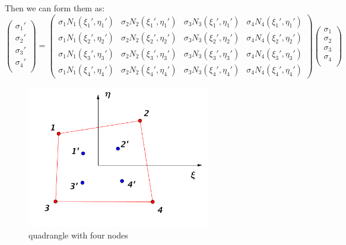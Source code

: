 Then we can form them as:
\begin{equation}
\begin{pmatrix}
{\sigma_1}' \\
{\sigma_2}' \\
{\sigma_3}' \\
{\sigma_4}' \\
\end{pmatrix} = \begin{pmatrix}
 \sigma_1 N_1\left({\xi_1}', {\eta_1}'\right) & \sigma_2 N_2\left({\xi_1}', {\eta_1}'\right) &   \sigma_3 N_3\left({\xi_1}', {\eta_1}'\right)  &  \sigma_4 N_4\left({\xi_1}', {\eta_1}'\right)     \\[0.3em]
 
 \sigma_1 N_1\left({\xi_2}', {\eta_2}'\right) & \sigma_2 N_2\left({\xi_2}', {\eta_2}'\right) & \sigma_3 N_3\left({\xi_2}', {\eta_2}'\right)  &  \sigma_4 N_4\left({\xi_2}', {\eta_2}'\right)            \\[0.3em]
 
\sigma_1 N_1\left({\xi_3}', {\eta_3}'\right) & \sigma_2 N_2\left({\xi_3}', {\eta_3}'\right)  & \sigma_3 N_3\left({\xi_3}', {\eta_3}'\right) &  \sigma_4 N_4\left({\xi_3}', {\eta_3}'\right)      \\[0.3em]

\sigma_1 N_1\left({\xi_4}', {\eta_4}'\right) &  \sigma_2 N_2\left({\xi_4}', {\eta_4}'\right) &  \sigma_3 N_3\left({\xi_4}', {\eta_4}'\right) &   \sigma_4 N_4\left({\xi_4}', {\eta_4}'\right)                             
\end{pmatrix} \begin{pmatrix}
\sigma_1 \\
\sigma_2 \\
\sigma_3 \\
\sigma_4 \\
\end{pmatrix}
\end{equation}	






\begin{figure}[h]
	\begin{center}
		\includegraphics[width=8cm,clip]{DirectCalculation.pdf}			
		\caption{quadrangle with four nodes}	\label{fig: DirectCalculation}
	\end{center} 
\end{figure}

